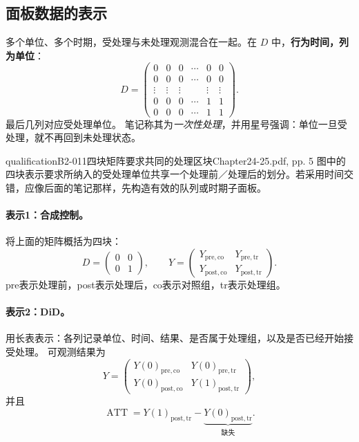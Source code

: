 \subsection{面板数据的表示}
多个单位、多个时期，受处理与未处理观测混合在一起。在 \(D\) 中，\textbf{行为时间，列为单位}：
\[
D=\begin{pmatrix}
0&0&0&\cdots&0&0\\
0&0&0&\cdots&0&0\\
\vdots&\vdots&\vdots&&\vdots&\vdots\\
0&0&0&\cdots&1&1\\
0&0&0&\cdots&1&1
\end{pmatrix}.
\]
最后几列对应受处理单位。
 笔记称其为\emph{一次性处理}，并用星号强调：单位一旦受处理，就不再回到未处理状态。
\begin{reviewnote}{qualification}{B2-011}{四块矩阵要求共同的处理区块}{Chapter24-25.pdf, pp. 5}
图中的四块表示要求所纳入的受处理单位共享一个处理前／处理后的划分。若采用时间交错，应像后面的笔记那样，先构造有效的队列或时期子面板。
\par{}
\end{reviewnote}


\paragraph{表示1：合成控制。}
将上面的矩阵概括为四块：
\[
D=\begin{pmatrix}0&0\\0&1\end{pmatrix},\qquad
Y=\begin{pmatrix}
Y_{\mathrm{pre,co}}&Y_{\mathrm{pre,tr}}\\
Y_{\mathrm{post,co}}&Y_{\mathrm{post,tr}}
\end{pmatrix}.
\]
pre表示处理前，post表示处理后，co表示对照组，tr表示处理组。
\paragraph{表示2：DiD。}
用长表表示：各列记录单位、时间、结果、是否属于处理组，以及是否已经开始接受处理。
可观测结果为
\[
Y=\begin{pmatrix}
Y(0)_{\mathrm{pre,co}}&Y(0)_{\mathrm{pre,tr}}\\
Y(0)_{\mathrm{post,co}}&Y(1)_{\mathrm{post,tr}}
\end{pmatrix},
\]
并且
\[
\operatorname{ATT}=Y(1)_{\mathrm{post,tr}}
-\underbrace{Y(0)_{\mathrm{post,tr}}}_{\text{缺失}}.
\]


